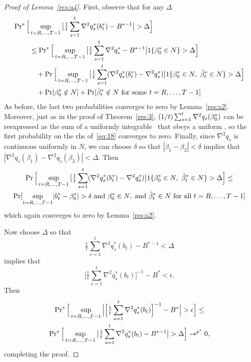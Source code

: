 \documentclass[12pt,fleqn]{article}
\begin{document}
\begin{proof}[Proof of Lemma~\ref{res:a4}]
First, observe that for any $\Delta$
\begin{align}\label{eq:18}
  \operatorname{Pr}^*\Big[&\sup_{t = R,\dots,T-1} \big\lvert \tfrac{1}{t} \sum_{s=1}^t \nabla^2 q_s^*(b_t^*) - B^{*-1} \big\rvert > \Delta \Big] \\
  &\leq \operatorname{Pr}^*\Big[\sup_{t=R,\dots,T-1} \big\lvert \tfrac{1}{t} \sum_{s=1}^t \nabla^2 q_s^* - B^{*-1} \big\rvert 1\{\beta_0^* \in N\}> \Delta \Big]\\
  &\quad + \operatorname{Pr}\Big[\sup_{t=R,\dots,T-1} \big\lvert \tfrac{1}{t} \sum_{s=1}^t (\nabla^2 q_s^*(b_t^*) - \nabla^2 q_s^*) \big\rvert 1\{\beta_0^* \in N,\ \hat \beta_t^* \in N\} > \Delta \Big] \\
  &\quad + \operatorname{Pr}[\beta_0^* \notin N] + \operatorname{Pr}[\hat \beta_t^* \notin N \text{ for some } t = R,\dots,T-1]
\end{align}
As before, the last two probabilities converges to zero by
Lemma~\ref{res:a2}.  Moreover, just as in the proof of
Theorem~\ref{res:3}, $(1/t) \sum_{s=1}^t \nabla^2 q_s(\beta_0^*)$ can
be reexpressed as the sum of a uniformly integrable \mds\ that obeys
a uniform \lln, so the first probability on the rhs of~\eqref{eq:18}
converges to zero. Finally, since $\nabla^2 q_s$ is continuous
uniformly in $N$, we can choose $\delta$ so that $|\beta_1 - \beta_2|
< \delta$ implies that $|\nabla^2 q_s(\beta_1) - \nabla^2
q_s(\beta_2)| < \Delta$. Then
\begin{multline*}
  \pr\Big[\sup_{t=R,\dots,T-1} \big\lvert \tfrac{1}{t} \sum_{s=1}^t (\nabla^2 q_s^*(b_t^*) - \nabla^2 q_s^*) \big\rvert 1\{\beta_0^* \in N,\ \bh_t^* \in N\} > \Delta \Big]
  \leq \\
\pr[\sup_{t=R,\dots,T-1}  \lvert b_t^* - \btrue^* \rvert > \delta\text{ and } \btrue^* \in N,\text{ and } \bh_t^* \in N \text{ for all } t = R,\dots,T-1]
\end{multline*}
which again converges to zero by Lemma~\ref{res:a2}.

Now choose $\Delta$ so that
\begin{equation*}
  \tfrac{1}{t} \sum_{s=1}^t \nabla^2 q_s^*(b_t) - B^{*-1} < \Delta
\end{equation*}
implies that
\begin{equation*}
\Big[\tfrac{1}{t} \sum_{s=1}^t \nabla^2 q_s^*(b_t)\Big]^{-1} - B^* < \epsilon.
\end{equation*}
Then
\begin{multline*}
  \operatorname{Pr}^*\Big[\sup_{t=R,\dots,T-1} \Big\lvert\Big[\tfrac{1}{t} \sum_{s=1}^t \nabla^2 q_s^*(b_t)\Big]^{-1} - B^*\Big\rvert
  > \epsilon\Big] \leq \\
  \operatorname{Pr}^*\Big[\sup_{t=R,\dots,T-1}\big\lvert\tfrac{1}{t} \sum_{s=1}^t \nabla^2 q_s^*(b_t) - B^{*-1}\big\rvert > \Delta\Big]
  \to^{p^*} 0,
\end{multline*}
completing the proof.
\end{proof}
\end{document}
